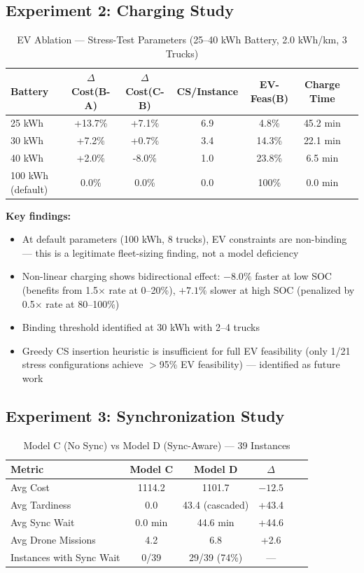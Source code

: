 \documentclass[11pt,a4paper]{article}
\begin{document}
\subsection{Experiment 2: Charging Study}

\begin{table}[H]
\centering
\caption{EV Ablation — Stress-Test Parameters (25--40 kWh Battery, 2.0 kWh/km, 3 Trucks)}
\label{tab:ev}
\begin{tabular}{lcccccc}
\toprule
\textbf{Battery} & \textbf{$\Delta$Cost(B-A)} & \textbf{$\Delta$Cost(C-B)} &
\textbf{CS/Instance} & \textbf{EV-Feas(B)} & \textbf{Charge Time} \\
\midrule
25 kWh & +13.7\% & +7.1\% & 6.9 & 4.8\% & 45.2 min \\
30 kWh & +7.2\%  & +0.7\% & 3.4 & 14.3\%& 22.1 min \\
40 kWh & +2.0\%  & -8.0\% & 1.0 & 23.8\%& 6.5 min  \\
100 kWh (default) & 0.0\% & 0.0\% & 0.0 & 100\% & 0.0 min \\
\bottomrule
\end{tabular}
\end{table}

\textbf{Key findings:}
\begin{itemize}
    \item At default parameters (100 kWh, 8 trucks), EV constraints are non-binding —
          this is a legitimate fleet-sizing finding, not a model deficiency
    \item Non-linear charging shows bidirectional effect: $-8.0\%$ faster at low SOC
          (benefits from 1.5$\times$ rate at 0--20\%), $+7.1\%$ slower at high SOC
          (penalized by 0.5$\times$ rate at 80--100\%)
    \item Binding threshold identified at 30 kWh with 2--4 trucks
    \item Greedy CS insertion heuristic is insufficient for full EV feasibility (only
          1/21 stress configurations achieve $>$95\% EV feasibility) — identified as
          future work
\end{itemize}

\subsection{Experiment 3: Synchronization Study}

\begin{table}[H]
\centering
\caption{Model C (No Sync) vs Model D (Sync-Aware) — 39 Instances}
\label{tab:sync}
\begin{tabular}{lccccc}
\toprule
\textbf{Metric} & \textbf{Model C} & \textbf{Model D} & \textbf{$\Delta$} \\
\midrule
Avg Cost & 1114.2 & 1101.7 & $-12.5$ \\
Avg Tardiness & 0.0 & 43.4 (cascaded) & +43.4 \\
Avg Sync Wait & 0.0 min & 44.6 min & +44.6 \\
Avg Drone Missions & 4.2 & 6.8 & +2.6 \\
Instances with Sync Wait & 0/39 & 29/39 (74\%) & — \\
\bottomrule
\end{tabular}
\end{table}
\end{document}
